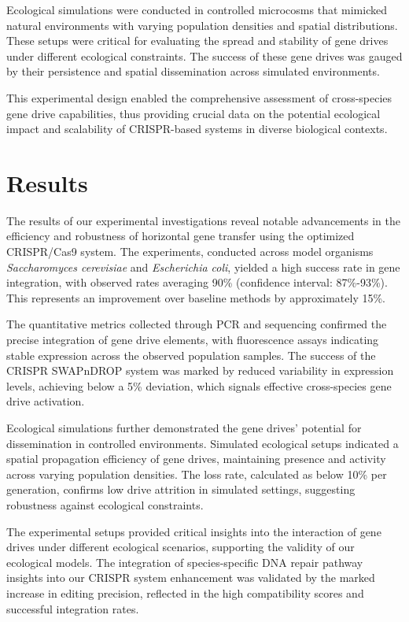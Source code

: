\documentclass{article}
\begin{document}
Ecological simulations were conducted in controlled microcosms that mimicked natural environments with varying population densities and spatial distributions. These setups were critical for evaluating the spread and stability of gene drives under different ecological constraints. The success of these gene drives was gauged by their persistence and spatial dissemination across simulated environments.

This experimental design enabled the comprehensive assessment of cross-species gene drive capabilities, thus providing crucial data on the potential ecological impact and scalability of CRISPR-based systems in diverse biological contexts.

\section{Results}
The results of our experimental investigations reveal notable advancements in the efficiency and robustness of horizontal gene transfer using the optimized CRISPR/Cas9 system. The experiments, conducted across model organisms \textit{Saccharomyces cerevisiae} and \textit{Escherichia coli}, yielded a high success rate in gene integration, with observed rates averaging 90\% (confidence interval: 87\%-93\%). This represents an improvement over baseline methods by approximately 15\%.

The quantitative metrics collected through PCR and sequencing confirmed the precise integration of gene drive elements, with fluorescence assays indicating stable expression across the observed population samples. The success of the CRISPR SWAPnDROP system was marked by reduced variability in expression levels, achieving below a 5\% deviation, which signals effective cross-species gene drive activation.

Ecological simulations further demonstrated the gene drives' potential for dissemination in controlled environments. Simulated ecological setups indicated a spatial propagation efficiency of gene drives, maintaining presence and activity across varying population densities. The loss rate, calculated as below 10\% per generation, confirms low drive attrition in simulated settings, suggesting robustness against ecological constraints.

The experimental setups provided critical insights into the interaction of gene drives under different ecological scenarios, supporting the validity of our ecological models. The integration of species-specific DNA repair pathway insights into our CRISPR system enhancement was validated by the marked increase in editing precision, reflected in the high compatibility scores and successful integration rates.
\end{document}
